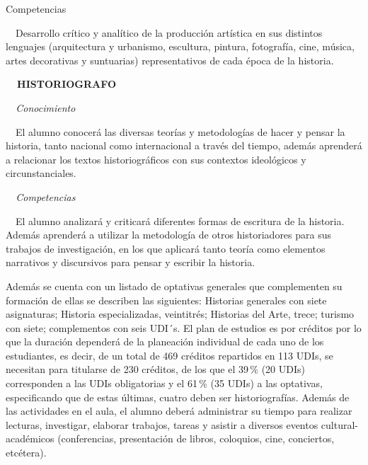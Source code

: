 {{Competencias}  \par \ \ Desarrollo crítico y analítico de la producción 
artística en sus distintos lenguajes (arquitectura y urbanismo, 
escultura, pintura, fotografía, cine, música, artes decorativas y 
suntuarias) representativos de cada época de la historia.  \par 
\textbf{\ \ HISTORIOGRAFO} \par \textit{\ \ Conocimiento }\par \ \ El 
alumno conocerá las diversas teorías y metodologías de hacer y pensar 
la historia, tanto nacional como internacional a través del tiempo, 
además aprenderá a relacionar los textos historiográficos con sus 
contextos ideológicos y circunstanciales.  \par \textit{\ \ 
Competencias }\par \ \ El alumno analizará y criticará diferentes 
formas de escritura de la historia. Además aprenderá a utilizar la 
metodología de otros historiadores para sus trabajos de investigación, 
en los que aplicará tanto teoría como elementos narrativos y 
discursivos para pensar y escribir la historia.\par \par \par \par }

Además se cuenta con un listado de optativas generales que complementen 
su formación de ellas se describen las siguientes: Historias generales 
con siete asignaturas; Historia especializadas, veintitrés; Historias 
del Arte, trece; turismo con siete; complementos con seis UDI´s. El 
plan de estudios es por créditos por lo que la duración dependerá de la 
planeación individual de cada uno de los estudiantes, es decir, de un 
total de 469 créditos repartidos en 113 UDIs, se necesitan para 
titularse de 230 créditos, de los que el 39\,\% (20 UDIs) corresponden a 
las UDIs obligatorias y el 61\,\% (35 UDIs) a las optativas, 
especificando que de estas últimas, cuatro deben ser historiografías. 
Además de las actividades en el aula, el alumno deberá administrar su 
tiempo para realizar lecturas, investigar, elaborar trabajos, tareas y 
asistir a diversos eventos cultural-académicos (conferencias, 
presentación de libros, coloquios, cine, conciertos, etcétera).  

